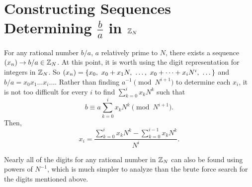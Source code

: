 \section{Constructing Sequences Determining $\frac{b}{a}$ in $\mathbb{Z}_N$}

\par For any rational number $b/a$, $a$ relatively prime to $N$, there
exists a sequence $(x_n) \rightarrow b/a \in \mathbb{Z}_N$. At this point, it is
worth using the digit representation for integers in $\mathbb{Z}_N$. So
$\xn=\{x_0, \ x_0+x_1N, \ \dots, \ x_0+\dots+x_iN^i, \ \dots\}$ and
$b/a = x_0x_1\dots x_i\dots$. Rather than finding $a^{-1}\pmod{N^{i+1}}$ to
determine each $x_i$, it is not too difficult for every $i$ to find
$\sum_{k=0}^ix_kN^k$ such that
\begin{equation}\label{eq:seq-rational}
  b \equiv a\sum_{k=0}^ix_kN^k \pmod{N^{i+1}}.
\end{equation}
Then, 
\begin{equation}
  x_i = \frac{\sum_{k=0}^ix_kN^k - \sum_{k=0}^{i-1}x_kN^k}{N^i}.
\end{equation}

\par Nearly all of the digits for any rational number in $\mathbb{Z}_N$ can also be
found using powers of $N^{-1}$, which is much simpler to analyze than the
brute force search for the digits mentioned above.

